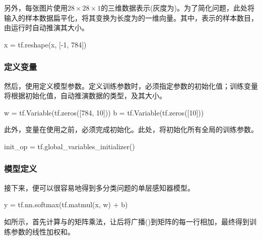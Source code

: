 \begin{content}
另外，每张图片使用$ 28 \times 28 \times 1 $的三维数据表示(灰度为)。为了简化问题，此处将输入的样本数据扁平化，将其变换为长度为的一维向量。其中，表示的样本数目，由运行时自动推演其大小。

\begin{leftbar}
\begin{python}
x = tf.reshape(x, [-1, 784])
\end{python}
\end{leftbar}

\subsubsection{定义变量}

然后，使用定义模型参数。定义训练参数时，必须指定参数的初始化值；训练变量将根据初始化值，自动推演数据的类型，及其大小。

\begin{leftbar}
\begin{python}
w = tf.Variable(tf.zeros([784, 10]))
b = tf.Variable(tf.zeros([10]))
\end{python}
\end{leftbar}

此外，变量在使用之前，必须完成初始化。此处，将初始化所有全局的训练参数。

\begin{leftbar}
\begin{python}
init_op = tf.global_variables_initializer()
\end{python}
\end{leftbar}

\subsubsection{模型定义}

接下来，便可以很容易地得到多分类问题的单层感知器模型。

\begin{leftbar}
\begin{python}
y = tf.nn.softmax(tf.matmul(x, w) + b)
\end{python}
\end{leftbar}

如所示，首先计算与的矩阵乘法，让后将广播()到矩阵的每一行相加，最终得到训练参数的线性加权和。


\end{content}
